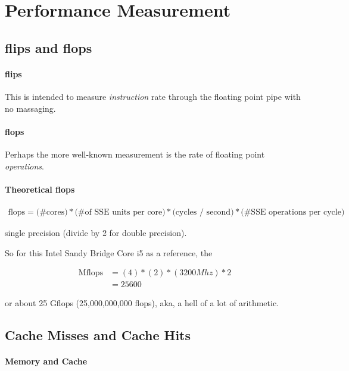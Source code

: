 \section{Performance Measurement}


\subsection{flips and flops}

\paragraph{flips}  This is intended to measure \emph{instruction} rate through 
the floating point pipe with no massaging.



\paragraph{flops}  Perhaps the more well-known measurement is the rate of  
floating point \emph{operations}.  



\paragraph{Theoretical flops}
\begin{align*}
\text{flops} = \text{(\# cores)} * \text{(\# of SSE units per core)} *  
\text{(cycles / second)} * \text{(\# SSE operations per cycle)}
\end{align*}

single precision (divide by 2 for double precision).

So for this Intel Sandy Bridge Core i5 as a reference, the 

\begin{align*}
\text{Mflops} &= (4) * (2) * (3200 Mhz) * 2 \\ 
&= 25600 
\end{align*}

or about 25 Gflops (25,000,000,000 flops), aka, a hell of a lot of arithmetic.




\subsection{Cache Misses and Cache Hits}

\paragraph{Memory and Cache}

